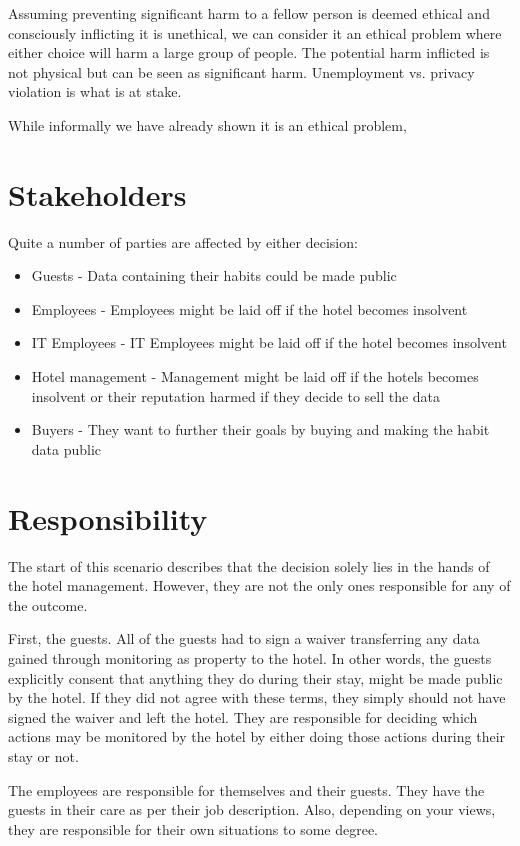 Assuming preventing significant harm to a fellow person is deemed ethical and consciously inflicting it is unethical, we can consider it an ethical problem where either choice will harm a large group of people. The potential harm inflicted is not physical but can be seen as significant harm. Unemployment vs. privacy violation is what is at stake.

While informally we have already shown it is an ethical problem, 

\section{Stakeholders}
Quite a number of parties are affected by either decision:

\begin{itemize}
	\item Guests - Data containing their habits could be made public
	\item Employees - Employees might be laid off if the hotel becomes insolvent
	\item IT Employees - IT Employees might be laid off if the hotel becomes insolvent
	\item Hotel management - Management might be laid off if the hotels becomes insolvent or their reputation harmed if they decide to sell the data
	\item Buyers - They want to further their goals by buying and making the habit data public
\end{itemize}


\section{Responsibility}
The start of this scenario describes that the decision solely lies in the hands of the hotel management. However, they are not the only ones responsible for any of the outcome.

First, the guests. All of the guests had to sign a waiver transferring any data gained through monitoring as property to the hotel. In other words, the guests explicitly consent that anything they do during their stay, might be made public by the hotel. If they did not agree with these terms, they simply should not have signed the waiver and left the hotel. They are responsible for deciding which actions may be monitored by the hotel by either doing those actions during their stay or not.

The employees are responsible for themselves and their guests. They have the guests in their care as per their job description. Also, depending on your views, they are responsible for their own situations to some degree.

